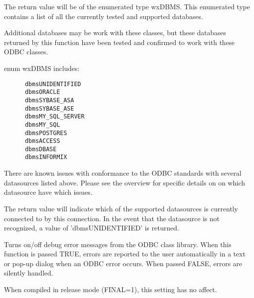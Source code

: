 

\label{wxdbdbms}



The return value will be of the enumerated type wxDBMS.  This enumerated
type contains a list of all the currently tested and supported databases.

Additional databases may be work with these classes, but these databases
returned by this function have been tested and confirmed to work with 
these ODBC classes.

enum wxDBMS includes:
\begin{verbatim}
      dbmsUNIDENTIFIED
      dbmsORACLE
      dbmsSYBASE_ASA
      dbmsSYBASE_ASE
      dbmsMY_SQL_SERVER
      dbmsMY_SQL
      dbmsPOSTGRES
      dbmsACCESS
      dbmsDBASE
      dbmsINFORMIX	
\end{verbatim}

There are known issues with conformance to the ODBC standards with several
datasources listed above.  Please see the overview for specific details on
on which datasource have which issues.


The return value will indicate which of the supported datasources is 
currently connected to by this connection.  In the event that the
datasource is not recognized, a value of 'dbmsUNIDENTIFIED' is returned.

\label{wxdbsetdebugerrormessages}




Turns on/off debug error messages from the ODBC class library.  When
this function is passed TRUE, errors are reported to the user automatically
in a text or pop-up dialog when an ODBC error occurs.  When passed FALSE,
errors are silently handled.

When compiled in release mode (FINAL=1), this setting has no affect.



